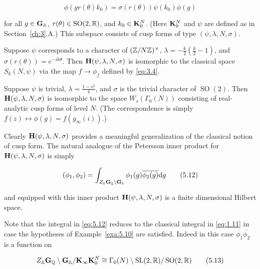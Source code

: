 \begin{equation}\label{eq:5.11}
\phi(gr(\theta)k_0) = \sigma(r(\theta))\psi(k_0)\phi(g)\tag{5.11}
\end{equation}

for all $g \in \mathbf{G}_{\mathbb{A}}$, $r(\theta) \in \operatorname{SO}(2,\mathbb{R})$, and $k_0 \in \mathbf{K}_0^N$. (Here $\mathbf{K}_0^N$ and $\psi$ are defined as in Section~\ref{ch:3}.A.) This subspace consists of cusp forms of type $(\psi, \lambda, N, \sigma)$.

\begin{example}\label{exa:5.10}

Suppose $\psi$ corresponds to a character of $(\mathbb{Z}/N\mathbb{Z})^{\times}$, $\lambda = -\frac{k}{2}\left(\frac{k}{2} - 1\right)$, and $\sigma(r(\theta)) = e^{-ik\theta}$. Then $\mathbf{H}(\psi, \lambda, N, \sigma)$ is isomorphic to the classical space $S_k(N, \psi)$ via the map $f \to \phi_f$ defined by \eqref{eq:3.4}.

\end{example}

\begin{example}\label{exa:5.11}

Suppose $\psi$ is trivial, $\lambda = \frac{1 - s^2}{4}$, and $\sigma$ is the trivial character of $\operatorname{SO}(2)$. Then $\mathbf{H}(\psi, \lambda, N, \sigma)$ is isomorphic to the space $W_s(\Gamma_0(N))$ consisting of real-analytic cusp forms of level $N$. (The correspondence is simply $f(z) \leftrightarrow \phi(g) = f(g_\infty(i))$.)

\end{example}

Clearly $\mathbf{H}(\psi,\lambda,N,\sigma)$ provides a meaningful generalization of the classical notion of cusp form. The natural analogue of the Petersson inner product for $\mathbf{H}(\psi,\lambda,N,\sigma)$ is simply

\begin{equation}\label{eq:5.12}
(\phi_1, \phi_2) = \int_{Z_{\mathbb{A}} \mathbf{G}_{\mathbb{Q}} \setminus \mathbf{G}_{\mathbb{A}}} \phi_1(g) \overline{\phi_2(g)} \mathrm{d} g\tag{5.12}
\end{equation}

and equipped with this inner product $\mathbf{H}(\psi, \lambda, N, \sigma)$ is a finite dimensional Hilbert space.

Note that the integral in \eqref{eq:5.12} reduces to the classical integral in \eqref{eq:1.11} in case the hypotheses of Example~\ref{exa:5.10} are satisfied. Indeed in this case $\phi_1\overline{\phi_2}$ is a function on

\begin{equation}\label{eq:5.13}
Z_{\mathbb{A}} \mathbf{G}_{\mathbb{Q}} \setminus \mathbf{G}_{\mathbb{A}} / \mathbf{K}_{\infty} \mathbf{K}_0^N \cong \Gamma_0(N) \setminus \operatorname{SL}(2,\mathbb{R}) / \operatorname{SO}(2,\mathbb{R})\tag{5.13}
\end{equation}

